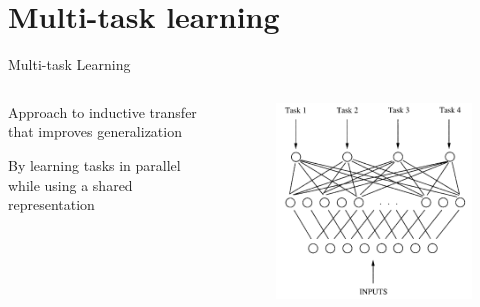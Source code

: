 \documentclass[12pt,aspectratio=169,handout]{beamer}
\begin{document}
\section{Multi-task learning}


\begin{frame}{Multi-task Learning}
	
	\begin{columns}
		\begin{column}{0.5\linewidth}
			Approach to inductive transfer that improves generalization
			
			\bigskip	
			
			By learning tasks in parallel while using a shared representation
			
		\end{column}
		\begin{column}{0.5\linewidth}
			\begin{figure}
				\includegraphics[width=\linewidth]{img/multitask.png}	
			\end{figure}
			
		\end{column}
	\end{columns}
	
	\bigskip
	
	\begin{footnotesize}
	\end{footnotesize}
	
	
\end{frame}
\end{document}
